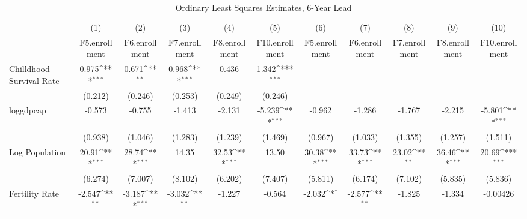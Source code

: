\begin{table}[htbp]\centering
\def\sym#1{\ifmmode^{#1}\else\(^{#1}\)\fi}
\caption{Ordinary Least Squares Estimates, 6-Year Lead}
\begin{tabular}{l*{10}{c}}
\toprule
                &\multicolumn{1}{c}{(1)}&\multicolumn{1}{c}{(2)}&\multicolumn{1}{c}{(3)}&\multicolumn{1}{c}{(4)}&\multicolumn{1}{c}{(5)}&\multicolumn{1}{c}{(6)}&\multicolumn{1}{c}{(7)}&\multicolumn{1}{c}{(8)}&\multicolumn{1}{c}{(9)}&\multicolumn{1}{c}{(10)}\\
                &\multicolumn{1}{c}{F5.enrollment}&\multicolumn{1}{c}{F6.enrollment}&\multicolumn{1}{c}{F7.enrollment}&\multicolumn{1}{c}{F8.enrollment}&\multicolumn{1}{c}{F10.enrollment}&\multicolumn{1}{c}{F5.enrollment}&\multicolumn{1}{c}{F6.enrollment}&\multicolumn{1}{c}{F7.enrollment}&\multicolumn{1}{c}{F8.enrollment}&\multicolumn{1}{c}{F10.enrollment}\\
\midrule
Chilldhood Survival Rate&    0.975\sym{***}&    0.671\sym{**} &    0.968\sym{***}&    0.436         &    1.342\sym{***}&                  &                  &                  &                  &                  \\
                &  (0.212)         &  (0.246)         &  (0.253)         &  (0.249)         &  (0.246)         &                  &                  &                  &                  &                  \\
\addlinespace
loggdpcap       &   -0.573         &   -0.755         &   -1.413         &   -2.131         &   -5.239\sym{***}&   -0.962         &   -1.286         &   -1.767         &   -2.215         &   -5.801\sym{***}\\
                &  (0.938)         &  (1.046)         &  (1.283)         &  (1.239)         &  (1.469)         &  (0.967)         &  (1.033)         &  (1.355)         &  (1.257)         &  (1.511)         \\
\addlinespace
Log Population  &    20.91\sym{***}&    28.74\sym{***}&    14.35         &    32.53\sym{***}&    13.50         &    30.38\sym{***}&    33.73\sym{***}&    23.02\sym{**} &    36.46\sym{***}&    20.69\sym{***}\\
                &  (6.274)         &  (7.007)         &  (8.102)         &  (6.202)         &  (7.407)         &  (5.811)         &  (6.174)         &  (7.102)         &  (5.835)         &  (5.836)         \\
\addlinespace
Fertility Rate  &   -2.547\sym{**} &   -3.187\sym{***}&   -3.032\sym{**} &   -1.227         &   -0.564         &   -2.032\sym{*}  &   -2.577\sym{**} &   -1.825         &   -1.334         & -0.00426         \\

\end{tabular}
\end{table}

